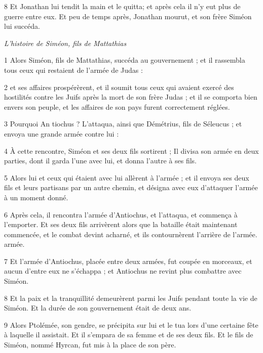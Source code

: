 \par 8 Et Jonathan lui tendit la main et le quitta; et après cela il n'y eut plus de guerre entre eux. Et peu de temps après, Jonathan mourut, et son frère Siméon lui succéda.



\par \textit{L'histoire de Siméon, fils de Mattathias}

\par 1 Alors Siméon, fils de Mattathias, succéda au gouvernement ; et il rassembla tous ceux qui restaient de l'armée de Judas :

\par 2 et ses affaires prospérèrent, et il soumit tous ceux qui avaient exercé des hostilités contre les Juifs après la mort de son frère Judas ; et il se comporta bien envers son peuple, et les affaires de son pays furent correctement réglées.

\par 3 Pourquoi An tiochus ? L'attaqua, ainsi que Démétrius, fils de Séleucus ; et envoya une grande armée contre lui :

\par 4 À cette rencontre, Siméon et ses deux fils sortirent ; Il divisa son armée en deux parties, dont il garda l'une avec lui, et donna l'autre à ses fils.

\par 5 Alors lui et ceux qui étaient avec lui allèrent à l'armée ; et il envoya ses deux fils et leurs partisans par un autre chemin, et désigna avec eux d'attaquer l'armée à un moment donné.

\par 6 Après cela, il rencontra l'armée d'Antiochus, et l'attaqua, et commença à l'emporter. Et ses deux fils arrivèrent alors que la bataille était maintenant commencée, et le combat devint acharné, et ils contournèrent l'arrière de l'armée. armée.

\par 7 Et l'armée d'Antiochus, placée entre deux armées, fut coupée en morceaux, et aucun d'entre eux ne s'échappa ; et Antiochus ne revint plus combattre avec Siméon.

\par 8 Et la paix et la tranquillité demeurèrent parmi les Juifs pendant toute la vie de Siméon. Et la durée de son gouvernement était de deux ans.

\par 9 Alors Ptolémée, son gendre, se précipita sur lui et le tua lors d'une certaine fête à laquelle il assistait. Et il s'empara de sa femme et de ses deux fils. Et le fils de Siméon, nommé Hyrcan, fut mis à la place de son père.

